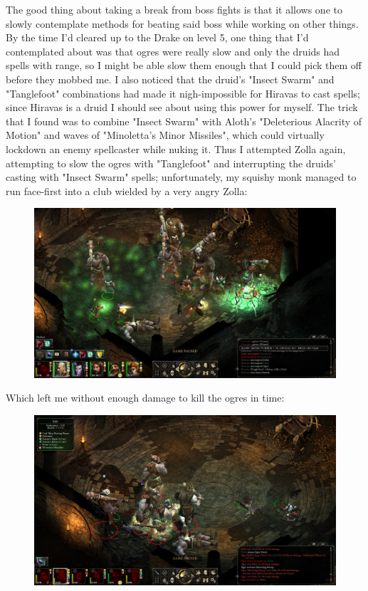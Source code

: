 \documentclass{article}
\begin{document}
The good thing about taking a break from boss fights is that it allows one to slowly contemplate methods for beating said boss while working on other things.  By the time I'd cleared up to the Drake on level 5, one thing that I'd contemplated about was that ogres were really slow and only the druids had spells with range, so I might be able slow them enough that I could pick them off before they mobbed me.  I also noticed that the druid's "Insect Swarm" and "Tanglefoot" combinations had made it nigh-impossible for Hiravas to cast spells; since Hiravas is a druid I should see about using this power for myself.  The trick that I found was to combine "Insect Swarm" with Aloth's "Deleterious Alacrity of Motion" and waves of "Minoletta's Minor Missiles", which could virtually lockdown an enemy spellcaster while nuking it.  Thus I attempted Zolla again, attempting to slow the ogres with "Tanglefoot" and interrupting the druids' casting with "Insect Swarm" spells; unfortunately, my squishy monk managed to run face-first into a club wielded by a very angry Zolla:

\begin{figure}
\includegraphics[scale=0.33]{files/blog/2018_06_16_pillars_of_eternity_path_of_the_damned_act_i/2018_06_16_zolla_r2_crit.jpg}
\end{figure}

Which left me without enough damage to kill the ogres in time:

\begin{figure}
\includegraphics[scale=0.33]{files/blog/2018_06_16_pillars_of_eternity_path_of_the_damned_act_i/2018_06_16_zolla_r2_wipe1.jpg}
\end{figure}
\end{document}
